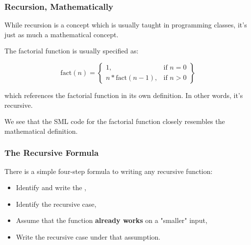 \documentclass[aspectratio=169]{beamer}
\begin{document}
\begin{frame}[fragile]
  \frametitle{Recursion, Mathematically}

  While recursion is a concept which is usually taught in programming classes, 
  it's just as much a mathematical concept.

  \pause
  \vspace{\fill}

  The factorial function is usually specified as: 

  \vspace{5pt}

  \begin{equation}
    \text{fact}(n) = 
    \left\{
        \begin{array}{lr}
            1, & \text{if } n = 0\\
            n * \text{fact}(n - 1), & \text{if } n > 0
        \end{array}
    \right\}
  \end{equation}

  \vspace{5pt}

  which references the factorial function in its own definition. In other words, it's 
  recursive.

  \pause
  \vspace{\fill}

  We see that the SML code for the factorial function closely resembles the mathematical
  definition. 

  \rprs
\end{frame}

\begin{frame}[fragile]
  \frametitle{The Recursive Formula}

  There is a simple four-step formula to writing any recursive function:

  \pause
  \vspace{5pt}

  \begin{itemize}
    \item Identify and write the , \pause
    \item Identify the recursive case, \pause 
    \item Assume that the function \textbf{already works} on a "smaller" input, \pause
    \item Write the recursive case under that assumption.
  \end{itemize}

  \pause
  \vspace{\fill}

\end{frame}
\end{document}
